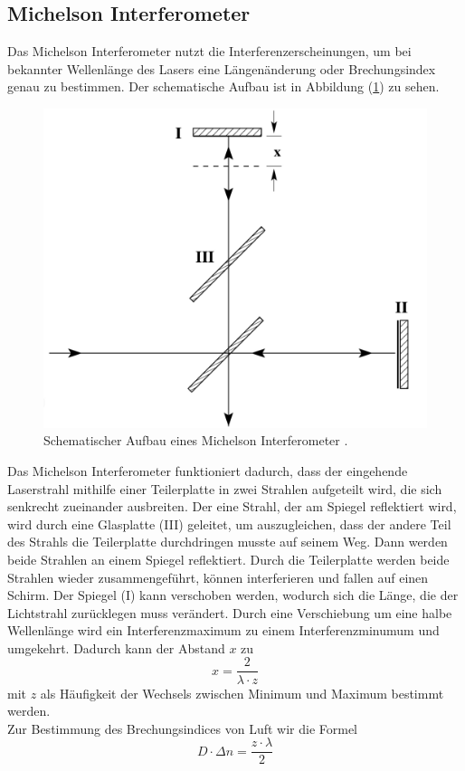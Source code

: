 \subsection{Michelson Interferometer}
Das Michelson Interferometer nutzt die Interferenzerscheinungen, um bei bekannter Wellenlänge des Lasers eine Längenänderung oder Brechungsindex 
genau zu bestimmen. Der schematische Aufbau ist in Abbildung (\ref{fig:Aufbau}) zu sehen. 
\begin{figure}[H]
    \centering
    \includegraphics[width=0.6\linewidth]{"content/Bilder/V401.png"}
    \caption{Schematischer Aufbau eines Michelson Interferometer \cite{anleitungV401}.}
    \label{fig:Aufbau}
\end{figure}
Das Michelson Interferometer funktioniert dadurch, dass der eingehende Laserstrahl mithilfe einer Teilerplatte in zwei Strahlen aufgeteilt wird, die sich senkrecht 
zueinander ausbreiten. Der eine Strahl, der am Spiegel reflektiert wird, wird durch eine Glasplatte (III) geleitet, um auszugleichen, dass der andere Teil des Strahls
die Teilerplatte durchdringen musste auf seinem Weg. Dann werden beide Strahlen an einem Spiegel reflektiert. Durch die Teilerplatte werden beide Strahlen wieder 
zusammengeführt, können interferieren und fallen auf einen Schirm. Der Spiegel (I) kann verschoben werden, wodurch sich die Länge, die der Lichtstrahl zurücklegen 
muss verändert. Durch eine Verschiebung um eine halbe Wellenlänge wird ein Interferenzmaximum zu einem Interferenzminumum und umgekehrt. Dadurch kann 
der Abstand $x$ zu 
\begin{equation}
    x = \frac{2}{\lambda \cdot z}
\end{equation}
mit $z$ als Häufigkeit der Wechsels zwischen Minimum und Maximum bestimmt werden. \\
Zur Bestimmung des Brechungsindices von Luft wir die Formel 
\begin{equation}
    D \cdot \Delta n = \frac{z \cdot \lambda}{2}
\end{equation}
